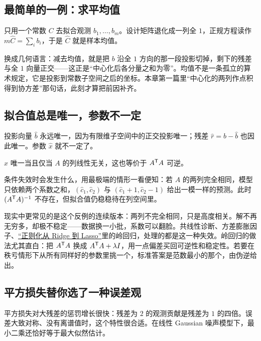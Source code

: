 \subsection{最简单的一例：求平均值}

只用一个常数 \(C\) 去拟合观测 \(b_1,\ldots,b_m\)。设计矩阵退化成一列全 \(1\)，正规方程读作 \(m\hat C=\sum_i b_i\)，于是 \(\hat C\) 就是样本均值。

换成几何语言：减去均值，就是把 \(b\) 沿全 \(1\) 方向的那一段投影切掉，剩下的残差与全 \(1\) 向量正交——这正是``中心化后各分量之和为零''。均值不是一条孤立的算术规定，它是投影到常数子空间之后的坐标。本章第一篇里``中心化的两列作点积得到协方差''那句话，此刻才算把前因补齐。

\subsection{拟合值总是唯一，参数不一定}

投影向量 \(\hat b\) 永远唯一，因为有限维子空间中的正交投影唯一；残差 \(\hat r=b-\hat b\) 也因此唯一。参数 \(\hat x\) 就不一定了。

\begin{proposition}
\(\hat x\) 唯一当且仅当 \(A\) 的列线性无关，这也等价于 \(A^{\mathsf{T}}A\) 可逆。
\end{proposition}

条件失效时会发生什么，用最极端的情形一看便知：若 \(A\) 的两列完全相同，模型只依赖两个系数之和，\((\hat c_1,\hat c_2)\) 与 \((\hat c_1+1,\hat c_2-1)\) 给出一模一样的预测。此时 \((A^{\mathsf{T}}A)^{-1}\) 不存在，但拟合值仍稳稳待在列空间里。

现实中更常见的是这个反例的连续版本：两列不完全相同，只是高度相关。解不再无穷多，却极不稳定——数据换一小批，系数可以翻脸。共线性诊断、方差膨胀因子、\hyperref[sec:13-Machine-Learning/02-Linear-Models/02]{``正则化从 Ridge 到 Lasso''}里的岭回归，处理的都是这一种失效。岭回归的做法尤其直白：把 \(A^{\mathsf{T}}A\) 换成 \(A^{\mathsf{T}}A+\lambda I\)，用一点偏差买回可逆性和稳定性。若要在秩亏情形下从所有同样好的参数里挑一个，标准答案是范数最小的那个，由伪逆给出。

\subsection{平方损失替你选了一种误差观}

平方损失对大残差的惩罚增长很快：残差为 \(2\) 的观测贡献是残差为 \(1\) 的四倍。误差大致对称、没有离谱值时，这个特性很合适。在线性 Gaussian 噪声模型下，最小二乘还恰好等于最大似然估计。

